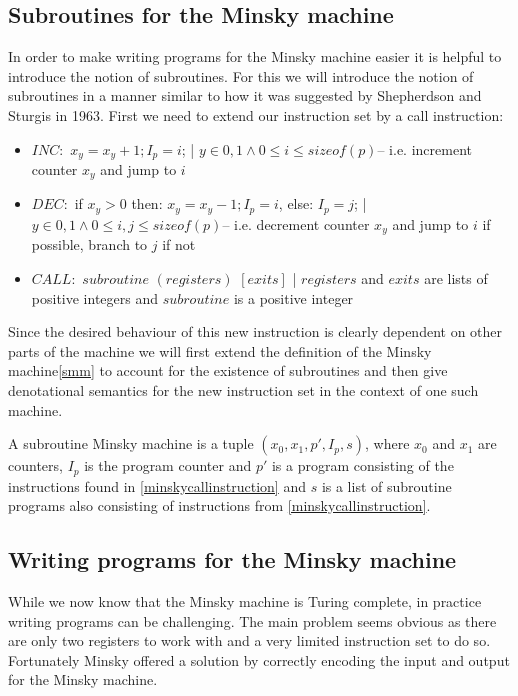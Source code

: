 \subsection{Subroutines for the Minsky machine}
In order to make writing programs for the Minsky machine easier it is helpful to introduce the notion of subroutines.
For this we will introduce the notion of subroutines in a manner similar to how it was suggested by Shepherdson and Sturgis in 1963\cite{Shepherdson:1963:CRF:321160.321170}.
First we need to extend our instruction set by a call instruction:
\begin{instructionset}
\label{minskycallinstruction}
\hfill
\begin{itemize}
\item{$INC:$} $x_y = x_y + 1; I_p = i$; | $ y\in{0,1} \land 0 \leq i \leq sizeof(p)$\hfill\break -- i.e. increment counter $x_y$ and jump to $i$
\item{$DEC:$} if $x_y > 0$ then: $x_y = x_y - 1; I_p = i$, else: $I_p = j$; | $ y\in{0,1} \land 0 \leq i,j \leq sizeof(p)$\hfill\break -- i.e. decrement counter $x_y$ and jump to $i$ if possible, branch to $j$ if not
\item{$CALL:$} $subroutine$ $(registers)$ $[exits]$ | $registers$ and $exits$ are lists of positive integers and $subroutine$ is a positive integer
\end{itemize}
\end{instructionset}

Since the desired behaviour of this new instruction is clearly dependent on other parts of the machine we will first extend the definition of the Minsky machine\ref{smm} to account for the existence of subroutines and then give denotational semantics for the new instruction set in the context of one such machine.
\begin{definition}
\label{smm}
A subroutine Minsky machine is a tuple $(x_0, x_1, p', I_p, s)$, where $x_0$ and $x_1$ are counters, $I_p$ is the program counter and $p'$ is a program consisting of the instructions found in \autoref{minskycallinstruction} and $s$ is a list of subroutine programs also consisting of instructions from \autoref{minskycallinstruction}.
\end{definition}



\subsection{Writing programs for the Minsky machine}
While we now know that the Minsky machine is Turing complete, in practice writing programs can be challenging.
The main problem seems obvious as there are only two registers to work with and a very limited instruction set to do so.
Fortunately Minsky offered a solution by correctly encoding the input and output for the Minsky machine\cite{Minsky:1967:CFI:1095587}.


